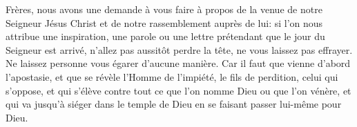 Frères, nous avons une demande à vous faire
	à propos de la venue de notre Seigneur Jésus Christ
	et de notre rassemblement auprès de lui:
	si l’on nous attribue une inspiration, une parole ou une lettre
	prétendant que le jour du Seigneur est arrivé,
	n’allez pas aussitôt perdre la tête, ne vous laissez pas effrayer.
Ne laissez personne vous égarer d’aucune manière.
Car il faut que vienne d’abord l’apostasie,
	et que se révèle l’Homme de l’impiété, le fils de perdition,
		celui qui s’oppose,
	et qui s’élève contre tout ce que l’on nomme Dieu ou que l’on vénère,
	et qui va jusqu’à siéger dans le temple de Dieu
		en se faisant passer lui-même pour Dieu.
